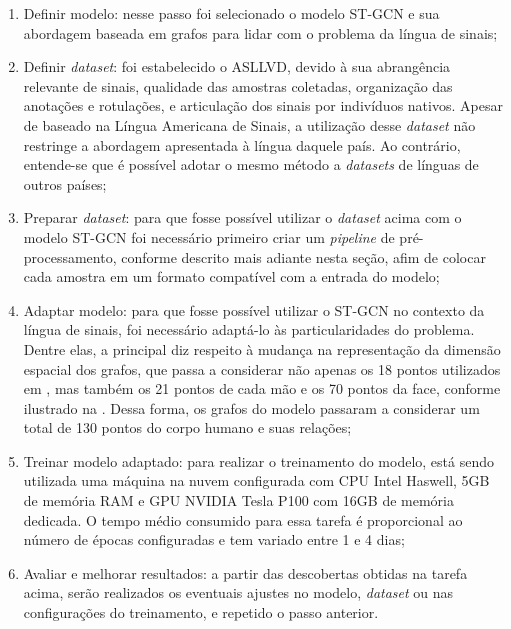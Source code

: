 \begin{enumerate}
    \item Definir modelo: nesse passo foi selecionado o modelo ST-GCN e sua abordagem baseada em grafos para lidar com o problema da língua de sinais;
    \item Definir \textit{dataset}: foi estabelecido o ASLLVD, devido à sua abrangência relevante de sinais, qualidade das amostras coletadas, organização das anotações e rotulações, e articulação dos sinais por indivíduos nativos. Apesar de baseado na Língua Americana de Sinais, a utilização desse \textit{dataset} não restringe a abordagem apresentada à língua daquele país. Ao contrário, entende-se que é possível adotar o mesmo método a \textit{datasets} de línguas de outros países;
    \item Preparar \textit{dataset}: para que fosse possível utilizar o \textit{dataset} acima com o modelo ST-GCN foi necessário primeiro criar um \textit{pipeline} de pré-processamento, conforme descrito mais adiante nesta seção, afim de colocar cada amostra em  um formato compatível com a entrada do modelo;
    \item Adaptar modelo: para que fosse possível utilizar o ST-GCN no contexto da língua de sinais, foi necessário adaptá-lo às particularidades do problema. Dentre elas, a principal diz respeito à mudança na representação da dimensão espacial dos grafos, que passa a considerar não apenas os 18 pontos utilizados em \cite{st-gcn-2018}, mas também os 21 pontos de cada mão e os 70 pontos da face, conforme ilustrado na . Dessa forma, os grafos do modelo passaram a considerar um total de 130 pontos do corpo humano e suas relações;
    \item Treinar modelo adaptado: para realizar o treinamento do modelo, está sendo utilizada uma máquina na nuvem configurada com CPU Intel Haswell, 5GB de memória RAM e GPU NVIDIA Tesla P100 com 16GB de memória dedicada. O tempo médio consumido para essa tarefa é proporcional ao número de épocas configuradas e tem variado entre 1 e 4 dias;
    \item Avaliar e melhorar resultados: a partir das descobertas obtidas na tarefa acima, serão realizados os eventuais ajustes no modelo, \textit{dataset} ou nas configurações do treinamento, e repetido o passo anterior.
\end{enumerate}

